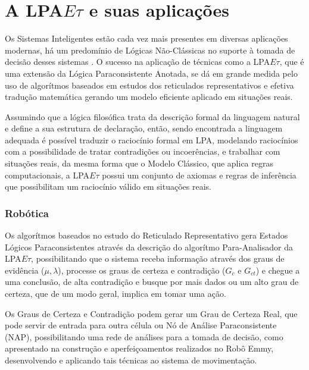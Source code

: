 


\section{A LPA$E\tau$ e suas aplicações}

Os Sistemas Inteligentes estão cada vez mais presentes em diversas
aplicações modernas, há um predomínio de
Lógicas Não-Clássicas no suporte à tomada de decisão desses sistemas \cite{JISF2011}. O sucesso na aplicação de técnicas como a LPA$E\tau$, que é uma extensão da Lógica Paraconsistente Anotada, se dá em grande medida pelo uso de algorítmos baseados em estudos dos reticulados representativos e efetiva tradução matemática gerando um modelo eficiente aplicado em situações reais.

Assumindo que a lógica filosófica trata da descrição formal da linguagem natural e define a sua estrutura de declaração, então, sendo encontrada a linguagem adequada é possível traduzir o raciocínio formal em LPA, modelando raciocínios com a possibilidade de tratar contradições ou incoerências, e trabalhar com situações reais, da mesma forma que o Modelo Clássico, que aplica regras computacionais, a LPA$E\tau$ possui um conjunto de axiomas e regras de inferência que possibilitam um raciocínio válido em situações reais.


\subsubsection{Robótica}

Os algorítmos baseados no estudo do Reticulado Representativo gera Estados Lógicos Paraconsistentes através da descrição do algorítmo Para-Analisador da LPA$E\tau$, possibilitando que o sistema receba informação através dos graus de evidência ($\mu, \lambda$), processe os graus de certeza e contradição ($G_c$ e $G_{ct}$) e chegue a uma conclusão, de alta contradição e busque por mais dados ou um alto grau de certeza, que de um modo geral, implica em tomar uma ação. 

Os Graus de Certeza e Contradição podem gerar um Grau de Certeza Real, que pode servir de entrada para outra célula ou Nó de Análise Paraconsistente (NAP), possibilitando uma rede de análises para a tomada de decisão, como apresentado na construção e aperfeiçoamentos realizados no Robô Emmy, \cite{JoaoInacio}\cite{ClaudioRodrigoTorres} desenvolvendo e aplicando tais técnicas ao sistema de movimentação.


